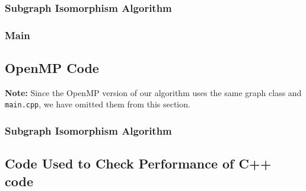 \documentclass{article}
\begin{document}
    \subsubsection{Subgraph Isomorphism Algorithm}
      
    \subsubsection{Main}
      

  \subsection{OpenMP Code}
    \textbf{Note:} Since the OpenMP version of our algorithm uses the same graph class and \texttt{main.cpp}, we have omitted them from this section.

    \subsubsection{Subgraph Isomorphism Algorithm}
      

  \subsection{Code Used to Check Performance of C++ code}
    

  \printbibliography[heading=bibintoc,
                     title={References}]
\end{document}
